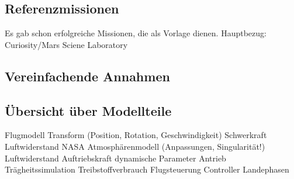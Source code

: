 \subsection{Referenzmissionen}
Es gab schon erfolgreiche Missionen, die als Vorlage dienen. Hauptbezug: Curiosity/Mars Sciene Laboratory

\subsection{Vereinfachende Annahmen}

\subsection{Übersicht über Modellteile}
Flugmodell
	Transform (Position, Rotation, Geschwindigkeit)
	Schwerkraft
	Luftwiderstand
		NASA Atmosphärenmodell (Anpassungen, Singularität!)
		Luftwiderstand
		Auftriebskraft
		dynamische Parameter
	Antrieb
		Trägheitssimulation
		Treibstoffverbrauch
Flugsteuerung
	Controller
	Landephasen